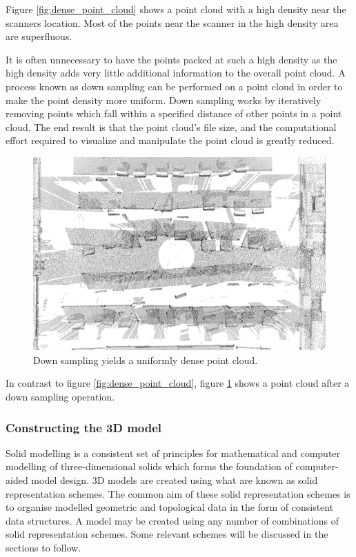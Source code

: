 \documentclass[11pt,a4paper]{report}
\begin{document}
						Figure \ref{fig:dense_point_cloud} shows a point cloud with a high density near the scanners location. Most of the points near the scanner in the high density area are superfluous.
						
						It is often unnecessary to have the points packed at such a high density as the high density adds very little additional information to the overall point cloud. A process known as down sampling can be performed on a point cloud in order to make the point density more uniform. Down sampling works by iteratively removing points which fall within a specified distance of other points in a point cloud. The end result is that the point cloud's file size, and the computational effort required to visualize and manipulate the point cloud is greatly reduced.
						\cite{_selection_????}
						
						\begin{figure}[H]
							\centering
							\includegraphics[width=1\textwidth]{uniform_point_cloud}
							\caption[Down sampled point cloud]{Down sampling yields a uniformly dense point cloud.}
							\label{fig:uniform_point_cloud}
						\end{figure}
						
						In contrast to figure \ref{fig:dense_point_cloud}, figure \ref{fig:uniform_point_cloud} shows a point cloud after a down sampling operation.
				
			\subsubsection{Constructing the 3D model}
				Solid modelling is a consistent set of principles for mathematical and computer modelling of three-dimensional solids which forms the foundation of computer-aided model design. 
				\cite{vadim_shapiro_solid_2001}
				3D models are created using what are known as solid representation schemes. The common aim of these solid representation schemes is to organise modelled geometric and topological data in the form of consistent data structures. A model may be created using any number of combinations of solid representation schemes. Some relevant schemes will be discussed in the sections to follow.
				
\end{document}

